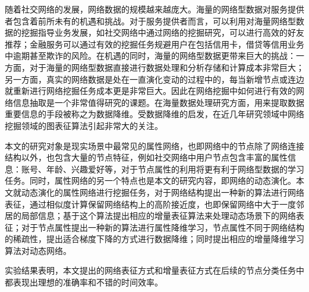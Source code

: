 随着社交网络的发展，网络数据的规模越来越庞大。海量的网络型数据对服务提供者包含着前所未有的机遇和挑战。对于服务提供者而言，可以利用对海量网络型数据的挖掘指导业务发展，如社交网络中通过网络的挖掘研究，可以进行高效的好友推荐；金融服务可以通过有效的挖掘任务规避用户在包括信用卡，借贷等信用业务中逾期甚至欺诈的风险。在机遇的同时，海量的网络型数据更带来巨大的挑战：一方面，对于海量的网络型数据直接进行数据处理和分析存储和计算成本非常巨大；另一方面，真实的网络数据是处在一直演化变动的过程中的，每当新增节点或连边就重新进行网络挖掘任务成本更是非常巨大。因此在网络挖掘中如何进行有效的网络信息抽取是一个非常值得研究的课题。在海量数据处理研究方面，用来提取数据重要信息的手段被称之为数据降维。受数据降维的启发，在近几年研究领域中网络挖掘领域的图表征算法引起非常大的关注。

本文的研究对象是现实场景中最常见的属性网络，也即网络中的节点除了网络连接结构以外，也包含大量的节点特征，例如社交网络中用户节点包含丰富的属性信息：账号、年龄、兴趣爱好等，对于节点属性的利用将更有利于网络型数据的学习任务。同时，属性网络的另一个特点也是本文的研究内容，即网络的动态演化。本文就动态演化的属性网络进行挖掘任务，对于网络结构提出一种新的算法进行网络表征，通过相似度计算保留网络结构上的高阶接近度，也即保留网络中大于一度邻居的局部信息；基于这个算法提出相应的增量表征算法来处理动态场景下的网络表征；对于节点属性提出一种新的算法进行属性降维学习，节点属性不同于网络结构的稀疏性，提出适合梯度下降的方式进行数据降维；同时提出相应的增量降维学习算法对动态网络。

实验结果表明，本文提出的网络表征方式和增量表征方式在后续的节点分类任务中都表现出理想的准确率和不错的时间效率。
